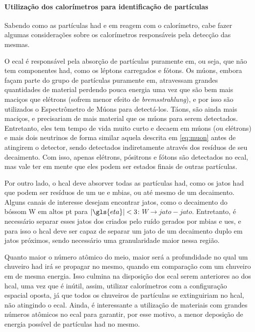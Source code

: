 \paragraph{Utilização dos calorímetros para identificação de partículas}
\label{par:cal_part_id}


Sabendo como as partículas \gls{had} e \gls{em} reagem com
o calorímetro, cabe fazer algumas considerações sobre os calorímetros
responsáveis pela detecção das mesmas. 

O \gls{ecal} é responsável pela absorção
de partículas puramente \gls{em}, ou seja, que não tem componentes
\gls{had}, como os léptons carregados e fótons. Os múons, embora façam parte do
grupo de partículas puramente \gls{em}, atravessam
grandes quantidades de material perdendo pouca energia uma vez que são bem mais
maciços que elétrons (sofrem menor efeito de \emph{bremsstrahlung}),
e por isso são utilizados o Espectrômetro de Múons para
detectá-los. Táons, são ainda mais maciços, e precisariam de mais
material que os múons para serem detectados. Entretanto, eles tem tempo de vida muito curto e
decaem em múons (ou elétrons) e mais dois neutrinos de forma similar aquela
descrita em \ref{eq:muon} antes de atingirem o detector, sendo detectados
indiretamente através dos resíduos de seu decaimento. Com isso, apenas elétrons,
pósitrons e fótons são detectados no \gls{ecal}, mas vale ter em mente que eles
podem ser estados finais de outras partículas. 

Por outro lado, o \gls{hcal} deve absorver todas as partículas \gls{had}, como os jatos
\gls{had} que podem ser resíduos de um \gls{ue} e \gls{mbias}, ou até mesmo de
um decaimento. Alguns canais de interesse desejam encontrar jatos, como 
o decaimento do bóssom W em altos \gls{pt} para $|\gls{eta}|<3$: $W\rightarrow jato-jato$. 
Entretanto, é necessário separar esses jatos dos criados pelo ruído 
gerados por \gls{mbias} e \glspl{ue}, e para isso o \gls{hcal} deve ser capaz de
separar um jato de um decaimento duplo em jatos próximos, sendo
necessário uma granularidade maior nessa região.

Quanto maior o número atômico do meio, maior será a profundidade no qual um
chuveiro \gls{had} irá se propagar no mesmo, quando em comparação com um chuveiro
\gls{em} de mesma energia. Isso culmina na disposição
dos \gls{ecal} serem anteriores ao dos \gls{hcal}, uma vez que é inútil, assim, utilizar calorímetros com a 
configuração espacial oposta, já que todos os chuveiros de partículas se
extinguiriam no \gls{hcal}, não atingindo o \gls{ecal}. Ainda, é interessante a
utilização de materiais com grandes números atômicos no \gls{ecal} para
garantir, por esse motivo, a menor deposição de energia possível de partículas
\gls{had} no mesmo.

